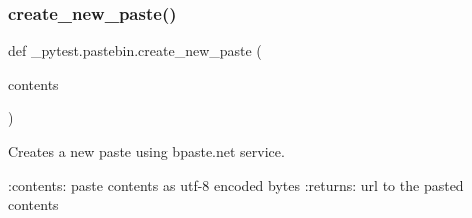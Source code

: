\subsubsection{\texorpdfstring{create\+\_\+new\+\_\+paste()}{create\_new\_paste()}}
{\footnotesize\ttfamily def \+\_\+pytest.\+pastebin.\+create\+\_\+new\+\_\+paste (\begin{DoxyParamCaption}\item[{}]{contents }\end{DoxyParamCaption})}

\begin{DoxyVerb}Creates a new paste using bpaste.net service.

:contents: paste contents as utf-8 encoded bytes
:returns: url to the pasted contents
\end{DoxyVerb}
 